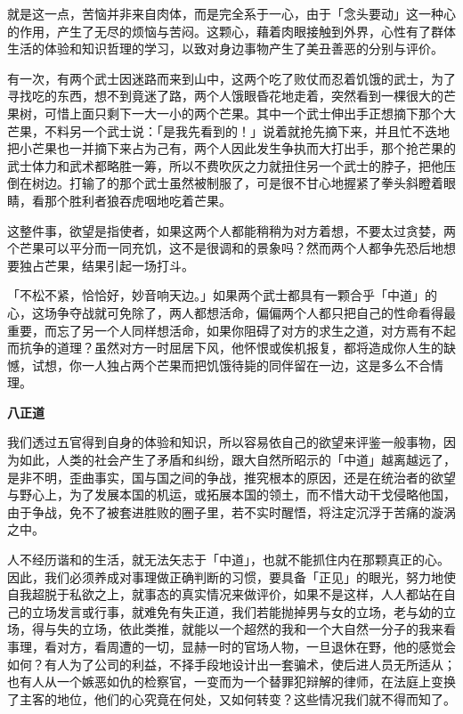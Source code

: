 \documentclass[twoside,openany]{book}
\newcommand{\mt}[1]{\textbullet \textbf{#1}}
\begin{document}
就是这一点，苦恼并非来自肉体，而是完全系于一心，由于「念头要动」这一种心的作用，产生了无尽的烦恼与苦闷。这颗心，藉着肉眼接触到外界，心性有了群体生活的体验和知识哲理的学习，以致对身边事物产生了美丑善恶的分别与评价。

有一次，有两个武士因迷路而来到山中，这两个吃了败仗而忍着饥饿的武士，为了寻找吃的东西，想不到竟迷了路，两个人饿眼昏花地走着，突然看到一棵很大的芒果树，可惜上面只剩下一大一小的两个芒果。其中一个武士伸出手正想摘下那个大芒果，不料另一个武士说：「是我先看到的！」说着就抢先摘下来，并且忙不迭地把小芒果也一并摘下来占为己有，两个人因此发生争执而大打出手，那个抢芒果的武士体力和武术都略胜一筹，所以不费吹灰之力就扭住另一个武士的脖子，把他压倒在树边。打输了的那个武士虽然被制服了，可是很不甘心地握紧了拳头斜瞪着眼睛，看那个胜利者狼吞虎咽地吃着芒果。

这整件事，欲望是指使者，如果这两个人都能稍稍为对方着想，不要太过贪婪，两个芒果可以平分而一同充饥，这不是很调和的景象吗？然而两个人都争先恐后地想要独占芒果，结果引起一场打斗。

「不松不紧，恰恰好，妙音响天边。」如果两个武士都具有一颗合乎「中道」的心，这场争夺战就可免除了，两人都想活命，偏偏两个人都只把自己的性命看得最重要，而忘了另一个人同样想活命，如果你阻碍了对方的求生之道，对方焉有不起而抗争的道理？虽然对方一时屈居下风，他怀恨或俟机报复，都将造成你人生的缺憾，试想，你一人独占两个芒果而把饥饿待毙的同伴留在一边，这是多么不合情理。

\mt{八正道}

我们透过五官得到自身的体验和知识，所以容易依自己的欲望来评鉴一般事物，因为如此，人类的社会产生了矛盾和纠纷，跟大自然所昭示的「中道」越离越远了，是非不明，歪曲事实，国与国之间的争战，推究根本的原因，还是在统治者的欲望与野心上，为了发展本国的机运，或拓展本国的领土，而不惜大动干戈侵略他国，由于争战，免不了被套进胜败的圈子里，若不实时醒悟，将注定沉浮于苦痛的漩涡之中。

人不经历谐和的生活，就无法矢志于「中道」，也就不能抓住内在那颗真正的心。因此，我们必须养成对事理做正确判断的习惯，要具备「正见」的眼光，努力地使自我超脱于私欲之上，就事态的真实情况来做评价，如果不是这样，人人都站在自己的立场发言或行事，就难免有失正道，我们若能抛掉男与女的立场，老与幼的立场，得与失的立场，依此类推，就能以一个超然的我和一个大自然一分子的我来看事理，看对方，看周遭的一切，显赫一时的官场人物，一旦退休在野，他的感觉会如何？有人为了公司的利益，不择手段地设计出一套骗术，使后进人员无所适从；也有人从一个嫉恶如仇的检察官，一变而为一个替罪犯辩解的律师，在法庭上变换了主客的地位，他们的心究竟在何处，又如何转变？这些情况我们就不得而知了。
\end{document}
